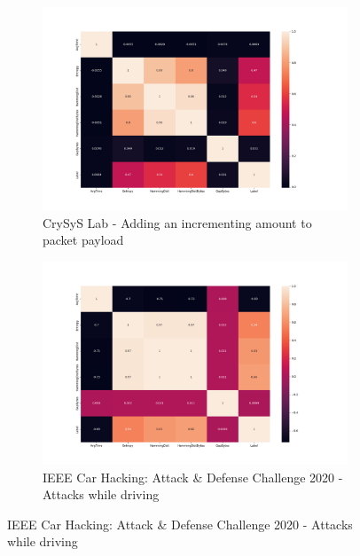 \begin{figure}
    \centering
    
    \begin{subfigure}[b]{.6\linewidth}
        \centering
        \includegraphics[width = \linewidth]{img/parts/app/feature_correlation/crysys/incr.png}
        \caption{CrySyS Lab - Adding an incrementing amount to packet payload}
        \label{subfig:fe_crysys_incr}
    \end{subfigure}
    
    \begin{subfigure}[b]{.6\linewidth}
        \centering
        \includegraphics[width = \linewidth]{img/parts/app/feature_correlation/ieee_challenge/pre_submit_D.png}
        \caption{IEEE Car Hacking: Attack \& Defense Challenge 2020 - Attacks while driving}
        \label{subfig:fe_ieee_challende_d}
    \end{subfigure}
    

\end{figure}

